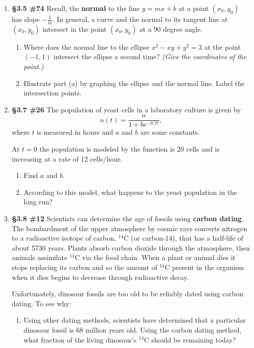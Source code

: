\documentclass[%
]{article}
\begin{document}
\begin{enumerate}
\item {\bf \S3.5 \#74}  Recall, the \textbf{normal} to the line $y=mx+b$ at a point $(x_0,y_0)$ has slope $-\frac{1}{m}$.  In general, a curve and the normal to its tangent line at $(x_0,y_0)$ intersect in the point $(x_0,y_0)$ at a 90 degree angle.  
	\begin{enumerate}
	\item Where does the normal line to the ellipse $x^2-xy+y^2=3$ at the point $(-1,1)$ intersect the ellipse a second time? \textit{(Give the coordinates of the point.)}
	\item Illustrate part (a) by graphing the ellipse and the normal line.  Label the intersection points.
	\end{enumerate}

\item {\bf \S3.7 \#26} The population of yeast cells in a laboratory culture is given by 
\[
n(t)=\frac{a}{1+be^{-0.7t}},
\]
where $t$ is measured in hours and $a$ and $b$ are some constants.  

At $t=0$ the population is modeled by the function is 20 cells and is increasing at a rate of 12 cells/hour.  
	\begin{enumerate}
	\item Find $a$ and $b$.
	\item According to this model, what happens to the yeast population in the long run?
	\end{enumerate}

\newpage
\item {\bf \S3.8 \#12} Scientists can determine the age of fossils using \textbf{carbon dating}.  The bombardment of the upper atmosphere by cosmic rays converts nitrogen to a radioactive isotope of carbon, $^{14}$C (or carbon-14), that has a half-life of about 5730 years.  Plants absorb carbon dioxide through the atmosphere, then animals assimilate $^{14}$C via the food chain.  When a plant or animal dies it stops replacing its carbon and so the amount of $^{14}$C present in the organism when it dies begins to decrease through radioactive decay.

Unfortunately, dinosaur fossils are too old to be reliably dated using carbon dating.  To see why:
	\begin{enumerate}
	\item Using other dating methods, scientists have determined that a particular dinosaur fossil is 68 million years old.  Using the carbon dating method, what fraction of the living dinosaur's $^{14}$C should be remaining today?  
	

\end{enumerate}
\end{enumerate}
\end{document}
